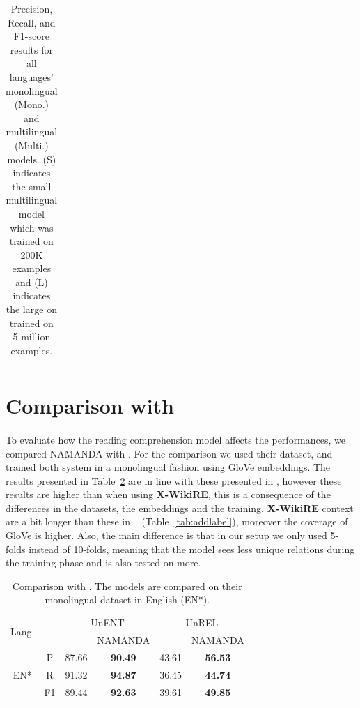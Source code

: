 \begin{table}[h]
\begin{tabular}{c|c|ccc|cc}
    \bottomrule
    \end{tabular}
      \caption{Precision, Recall, and F1-score results for all languages' monolingual (Mono.) and multilingual (Multi.) models. (S) indicates the small multilingual model which was trained on 200K examples and (L) indicates the large on trained on 5 million examples.}
  \label{table:bigtable}
\end{table}


\section{Comparison with \cite{levy2017zero}}
\paragraph{}
To evaluate how the reading comprehension model affects the performances, we compared NAMANDA with \cite{levy2017zero}. For the comparison we used their dataset, and trained both system in a monolingual fashion using GloVe embeddings. The results presented in Table~\ref{table:comparison} are in line with these presented in \citep{kundu2018namanda}, however these results are higher than when using \textbf{X-WikiRE}, this is a consequence of the differences in the datasets, the embeddings and the training. \textbf{X-WikiRE} context are a bit longer than these in ~\cite{levy2017zero} (Table~\ref{tab:addlabel}), moreover the coverage of GloVe is higher. Also, the main difference is that in our setup we only used 5-folds instead of 10-folds, meaning that the model sees less unique relations during the training phase and is also tested on more.   


\begin{table}[h!]
\fontsize{10}{10}\selectfont
  \centering
    \begin{tabular}{c|c|cc|cc}
    \toprule
    \multirow{2}{*}{Lang.} & &  \multicolumn{2}{c|}{UnENT} & \multicolumn{2}{c}{UnREL} \\

     &  &  \cite{levy2017zero} & NAMANDA &  \cite{levy2017zero} & NAMANDA \\
     \midrule
     
    \multirow{3}{*}{EN*} & P  & 87.66 & \textbf{90.49} & 43.61 & \textbf{56.53} \\
                         & R  & 91.32 & \textbf{94.87} & 36.45 & \textbf{44.74} \\
                         & F1 & 89.44 & \textbf{92.63} & 39.61 & \textbf{49.85} \\


    \bottomrule
    \end{tabular}
      \caption{Comparison with \cite{levy2017zero}. The models are compared on their monolingual dataset in English (EN*).}
  \label{table:comparison}
\end{table}


